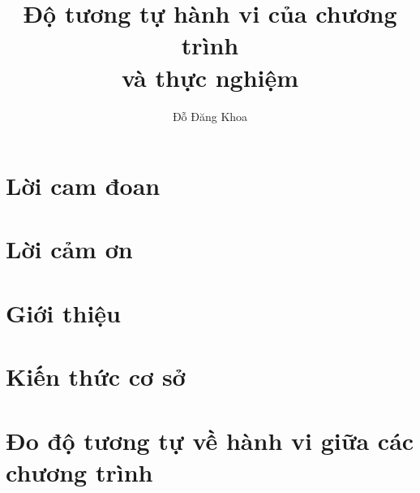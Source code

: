 \documentclass[a4paper,oneside,openright]{memoir}
\title{Độ tương tự hành vi của chương trình \\và thực nghiệm}
\author{Đỗ Đăng Khoa}
\begin{document}
\maketitle{} %


\listoftodos{}

	
% 


% 
% 


\chapter*{Lời cam đoan}


\chapter*{Lời cảm ơn}



% 

\newpage
\tableofcontents


% 

\chapter{Giới thiệu}


\chapter{Kiến thức cơ sở}


\chapter{Đo độ tương tự về hành vi giữa các chương trình}

\end{document}
